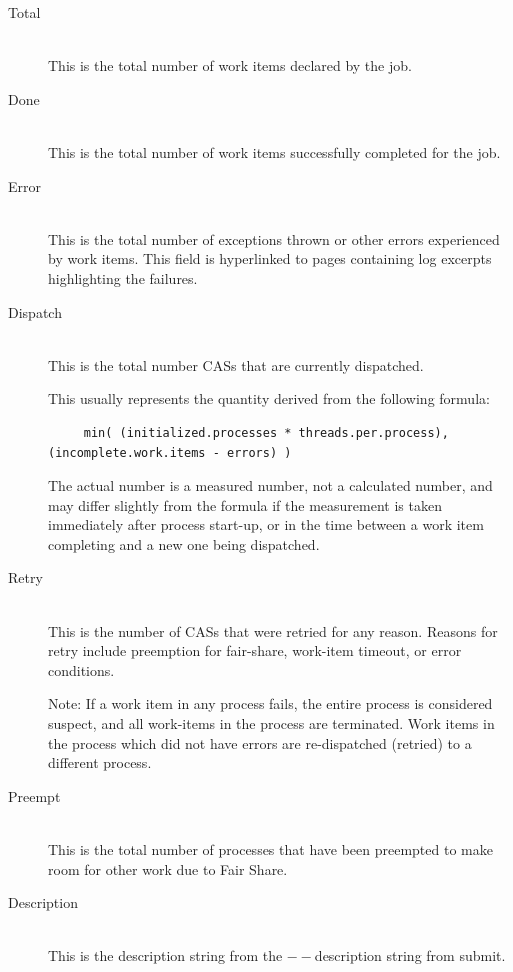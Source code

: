 \begin{description}
            \item[Total] \hfill \\
              This is the total number of work items declared by the job.
              
            \item[Done] \hfill \\
              This is the total number of work items successfully completed for the job.
              
            \item[Error] \hfill \\
              This is the total number of exceptions thrown or other errors experienced by work
              items. This field is hyperlinked to pages containing log excerpts highlighting
              the failures.
              
            \item[Dispatch] \hfill \\
              This is the total number CASs that are currently dispatched. 

              This usually represents the quantity derived from the following formula:
\begin{verbatim}              
     min( (initialized.processes * threads.per.process), (incomplete.work.items - errors) )
\end{verbatim}

              The actual number is a measured number, not a calculated number, and may differ
              slightly from the formula if the measurement is taken immediately after process
              start-up, or in the time between a work item completing and a new one being
              dispatched.
              
            \item[Retry] \hfill \\
              This is the number of CASs that were retried for any reason.  Reasons for retry
              include preemption for fair-share, work-item timeout, or error conditions.

              Note: If a work item in any process fails, the entire process is considered
              suspect, and all work-items in the process are terminated.  Work items in the
              process which did not have errors are re-dispatched (retried) to a different
              process.
              
            \item[Preempt] \hfill \\
              This is the total number of processes that have been preempted to make room for
              other work due to Fair Share.
              
            \item[Description] \hfill \\
              This is the description string from the $--$description string from submit.
            \end{description}

